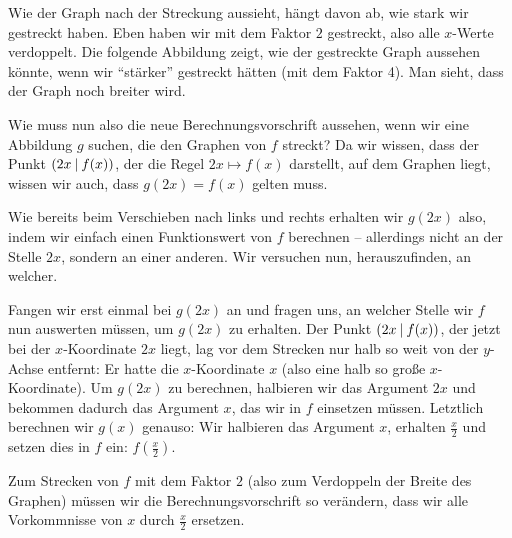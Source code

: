 \documentclass[../../main.tex]{subfiles}
\begin{document}
\begin{example}{}
    Wie der Graph nach der Streckung aussieht, hängt davon ab, wie stark wir gestreckt haben. Eben haben wir mit dem Faktor $2$ gestreckt, also alle $x$-Werte verdoppelt. Die folgende Abbildung zeigt, wie der gestreckte Graph aussehen könnte, wenn wir \enquote{stärker} gestreckt hätten (mit dem Faktor 4). Man sieht, dass der Graph noch breiter wird.

    \begin{center}
    \end{center}
\end{example}

Wie muss nun also die neue Berechnungsvorschrift aussehen, wenn wir eine Abbildung $g$ suchen, die den Graphen von $f$ streckt? Da wir wissen, dass der Punkt $\left(2x \:\middle|\: f(x)\right)$, der die Regel $2x\mapsto f(x)$ darstellt, auf dem Graphen liegt, wissen wir auch, dass $g(2x)=f(x)$ gelten muss. 

Wie bereits beim Verschieben nach links und rechts erhalten wir $g(2x)$ also, indem wir einfach einen Funktionswert von $f$ berechnen -- allerdings nicht an der Stelle $2x$, sondern an einer anderen. Wir versuchen nun, herauszufinden, an welcher.

Fangen wir erst einmal bei $g(2x)$ an und fragen uns, an welcher Stelle wir $f$ nun auswerten müssen, um $g(2x)$ zu erhalten. Der Punkt $\left(2x \:\middle|\: f(x)\right)$, der jetzt bei der $x$-Koordinate $2x$ liegt, lag vor dem Strecken nur halb so weit von der $y$-Achse entfernt: Er hatte die $x$-Koordinate $x$ (also eine halb so große $x$-Koordinate). Um $g(2x)$ zu berechnen, halbieren wir das Argument $2x$ und bekommen dadurch das Argument $x$, das wir in $f$ einsetzen müssen. Letztlich berechnen wir $g(x)$ genauso: Wir halbieren das Argument $x$, erhalten $\frac{x}{2}$ und setzen dies in $f$ ein: $f(\frac{x}{2})$.

Zum Strecken von $f$ mit dem Faktor $2$ (also zum Verdoppeln der Breite des Graphen) müssen wir die Berechnungsvorschrift so verändern, dass wir alle Vorkommnisse von $x$ durch $\frac{x}{2}$ ersetzen.
\end{document}
